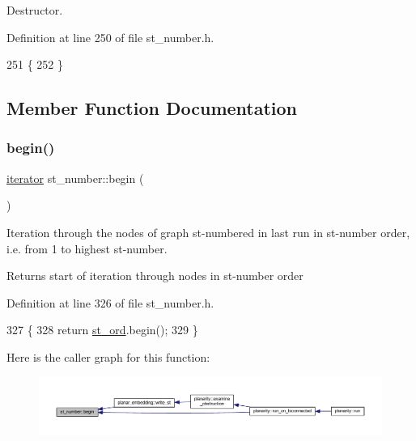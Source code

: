 Destructor. 



Definition at line 250 of file st\+\_\+number.\+h.


\begin{DoxyCode}
251     \{
252     \}
\end{DoxyCode}


\subsection{Member Function Documentation}
\mbox{\label{classst__number_a1eddb2577b16109d22cde98a8ffde057}} 
\subsubsection{\texorpdfstring{begin()}{begin()}}
{\footnotesize\ttfamily \mbox{\hyperlink{classst__number_a3aa3701636f69a567c5f6a676afafd39}{iterator}} st\+\_\+number\+::begin (\begin{DoxyParamCaption}{ }\end{DoxyParamCaption})\hspace{0.3cm}{\ttfamily [inline]}}



Iteration through the nodes of graph st-\/numbered in last run in st-\/number order, i.\+e. from 1 to highest st-\/number. 

\begin{DoxyReturn}{Returns}
start of iteration through nodes in st-\/number order 
\end{DoxyReturn}


Definition at line 326 of file st\+\_\+number.\+h.


\begin{DoxyCode}
327     \{
328     \textcolor{keywordflow}{return} \mbox{\hyperlink{classst__number_af2160b5e111fe3730b4f9f3f3d09f98f}{st\_ord}}.begin();
329     \}   
\end{DoxyCode}
Here is the caller graph for this function\+:\nopagebreak
\begin{figure}[H]
\begin{center}
\leavevmode
\includegraphics[width=350pt]{classst__number_a1eddb2577b16109d22cde98a8ffde057_icgraph}
\end{center}
\end{figure}
\mbox{\label{classst__number_a2aad4550b821c52d6998bff35fd8648f}} 
